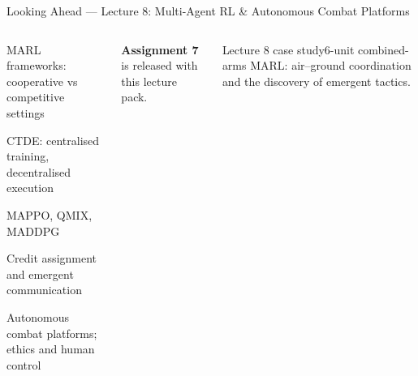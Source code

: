 \documentclass[aspectratio=169,10pt,t]{beamer}
\begin{document}
\begin{frame}{Looking Ahead --- Lecture 8: Multi-Agent RL \& Autonomous Combat Platforms}
\begin{columns}[T]
\begin{tl}\item MARL frameworks: cooperative vs competitive settings\item CTDE: centralised training, decentralised execution\item MAPPO, QMIX, MADDPG\item Credit assignment and emergent communication\item Autonomous combat platforms; ethics and human control\end{tl}
\begin{ibox}\scriptsize\textbf{Assignment 7} is released with this lecture pack.\end{ibox}
\begin{cbox}{Lecture 8 case study}\scriptsize 6-unit combined-arms MARL: air--ground coordination and the discovery of emergent tactics.\end{cbox}
\end{columns}
\end{frame}
\end{document}
